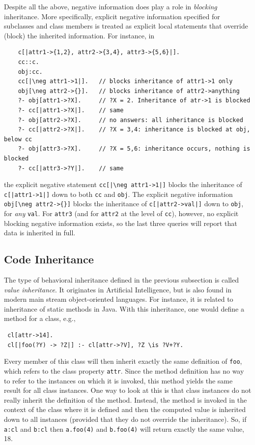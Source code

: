\documentclass[11pt]{article}
\newcommand{\bs}{\textbackslash}
\newcommand{\RULELOGNEG}{{\texttt{{\bs}neg}}\xspace}
\begin{document}
Despite all the above, negative information does play a role in
\emph{blocking} inheritance. More specifically, explicit negative
information specified for subclasses and class members is treated as
explicit local statements that override (block) the inherited information. For
instance, in
\begin{verbatim}
    c[|attr1->{1,2}, attr2->{3,4}, attr3->{5,6}|].
    cc::c.
    obj:cc.
    cc[|\neg attr1->1|].   // blocks inheritance of attr1->1 only
    obj[\neg attr2->{}].   // blocks inheritance of attr2->anything
    ?- obj[attr1->?X].     // ?X = 2. Inheritance of atr->1 is blocked
    ?- cc[|attr1->?X|].    // same
    ?- obj[attr2->?X].     // no answers: all inheritance is blocked
    ?- cc[|attr2->?X|].    // ?X = 3,4: inheritance is blocked at obj, below cc
    ?- obj[attr3->?X].     // ?X = 5,6: inheritance occurs, nothing is blocked
    ?- cc[|attr3->?Y|].    // same
\end{verbatim}
the explicit negative statement \texttt{cc[|\RULELOGNEG attr1->1|]} blocks the
inheritance of \texttt{c[|attr1->1|]} down to both \texttt{cc} and \texttt{obj}.
The explicit negative information \verb|obj[\neg attr2->{}]|
blocks the inheritance of \texttt{c[|attr2->val|]} down to \texttt{obj},
for \emph{any} \texttt{val}.  
For \texttt{attr3} (and for \texttt{attr2} at the level of \texttt{cc}),
however, no explicit blocking negative information
exists, so the last three queries will report that data is inherited in
full.

\subsection{Code Inheritance}

The type of behavioral inheritance defined in the previous subsection is
called \emph{value inheritance}.  It originates in Artificial Intelligence,
but is also found in modern main stream object-oriented languages.
For instance, it is related to inheritance of static methods in Java.
With this inheritance, one would define a method for a class, e.g., 
\begin{verbatim}
 cl[attr->14].
 cl[|foo(?Y) -> ?Z|] :- cl[attr->?V], ?Z \is ?V+?Y.
\end{verbatim}
Every member of this class will then inherit exactly the same definition of
{\tt foo},
which refers to the class property {\tt attr}. Since the method definition
has no way to refer to the instances on which it is invoked,
this method yields the same result for all class instances.
One way to look at this is
that class instances do not really inherit the definition of the method.
Instead, the method is invoked in the context of the class where it is
defined and then the computed value is inherited down to all instances
(provided that they do not override the inheritance).  So, if {\tt a:cl}
and {\tt b:cl} then {\tt a.foo(4)} and {\tt b.foo(4)} will return exactly
the same value, 18.
\end{document}

